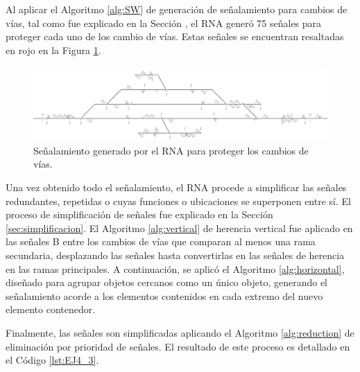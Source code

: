 	Al aplicar el Algoritmo \ref{alg:SW} de generación de señalamiento para cambios de vías, tal como fue explicado en la Sección \label{sec:signal_switches}, el RNA generó 75 señales para proteger cada uno de los cambio de vías. Estas señales se encuentran resaltadas en rojo en la Figura \ref{fig:EJ4_6}.

	\begin{figure}[H]
		\centering
		\includegraphics[width=1\textwidth]{resultados-obtenidos/ejemplo4/images/4_step4.png}
		\centering\caption{Señalamiento generado por el RNA para proteger los cambios de vías.}
		\label{fig:EJ4_6}
	\end{figure}

	Una vez obtenido todo el señalamiento, el RNA procede a simplificar las señales redundantes, repetidas o cuyas funciones o ubicaciones se superponen entre sí. El proceso de simplificación de señales fue explicado en la Sección \ref{sec:simplificacion}. El Algoritmo \ref{alg:vertical} de herencia vertical fue aplicado en las señales B entre los cambios de vías que comparan al menos una rama secundaria, desplazando las señales hasta convertirlas en las señales de herencia en las ramas principales. A continuación, se aplicó el Algoritmo \ref{alg:horizontal}, diseñado para agrupar objetos cercanos como un único objeto, generando el señalamiento acorde a los elementos contenidos en cada extremo del nuevo elemento contenedor.
		
	Finalmente, las señales son simplificadas aplicando el Algoritmo \ref{alg:reduction} de eliminación por prioridad de señales. El resultado de este proceso es detallado en el Código \ref{lst:EJ4_3}.

